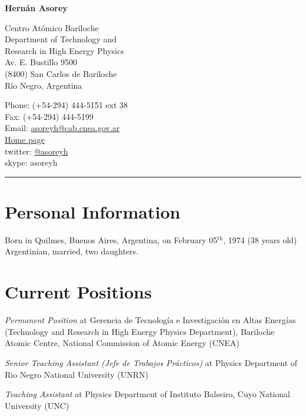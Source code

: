 \documentclass[11pt, a4paper]{article}
\renewenvironment{itemize}{
  \begin{list}{}{
    \setlength{\leftmargin}{0em}
    \setlength{\itemsep}{0.25em}
    \setlength{\parskip}{0pt}
    \setlength{\parsep}{.250em}
  }
}{
  \end{list}
}
\begin{document}
\begin{center}{\huge \bf Hernán Asorey}\\[1cm]\end{center}
\begin{minipage}[t]{0.495\textwidth}
  Centro Atómico Bariloche\\
  Department of Technology and\\
  Research in High Energy Physics\\
  Av. E. Bustillo 9500\\
  (8400) San Carlos de Bariloche\\
  Río Negro, Argentina\\[.2cm]
\end{minipage}
\begin{minipage}[t]{0.495\textwidth}
  Phone: (+54-294) 444-5151 ext 38\\
  Fax: (+54-294) 444-5199\\
  Email: \href{mailto:asoreyh@cab.cnea.gov.ar}{asoreyh@cab.cnea.gov.ar}\\
  \href{http://fisica.cab.cnea.gov.ar/particulas/wiki/User:Asoreyh}{Home page}\\
  twitter: \href{https://twitter.com/#!/asoreyh}{@asoreyh}\\
  skype: asoreyh\\
\end{minipage}
\hrule

\section*{Personal Information}
Born in Quilmes, Buenos Aires, Argentina, on February 05$^\mathrm{th}$, 1974 (38 years old)\\
Argentinian, married, two daughters.

\section*{Current Positions}
\begin{itemize}
\item \emph{Permanent Position} at Gerencia de Tecnología e Investigación en Altas
Energías (Technology and Research in High Energy Physics Department), Bariloche
Atomic Centre, National Commission of Atomic Energy (CNEA)
\item \emph{Senior Teaching Assistant (Jefe de Trabajos Prácticos)} at
Physics Department of Rio Negro National University (UNRN)
\item \emph{Teaching Assistant} at Physics Department of Instituto Balseiro, Cuyo
National University (UNC)
\end{itemize}
\end{document}
